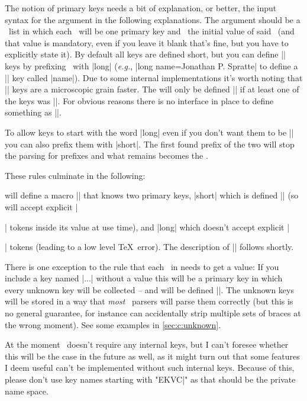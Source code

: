 The notion of primary keys needs a bit of explanation, or better, the input
syntax for the argument  in the following explanations. The
 argument should be a \kv\ list in which each \key\ will be
one primary key and \val\ the initial value of said \key\ (and that value is
mandatory, even if you leave it blank that's fine, but you have to explicitly
state it). By default all keys are defined short, but you can define |\long|
keys by prefixing \key\ with |long| (\emph{e.g.},
|long name=Jonathan P. Spratte| to define a |\long| key called |name|). Due to
some internal implementations it's worth noting that |\long| keys are a
microscopic grain faster. The  will only be defined |\long| if at least
one of the keys was |\long|. For obvious reasons there is no interface in place
to define something as |\protected|.

To allow keys to start with the word |long| even if you don't want them to be
|\long| you can also prefix them with |short|. The first found prefix of the two
will stop the parsing for prefixes and what remains becomes the \key.

These rules culminate in the following:

will define a macro |\foo| that knows two primary keys, |short| which is defined
|\long| (so will accept explicit |\par| tokens inside its value at use time),
and |long| which doesn't accept explicit |\par| tokens (leading to a low level
\TeX\ error). The description of |\ekvcSplit| follows shortly.

There is one exception to the rule that each \key\ in  needs
to get a value: If you include a key named |...| without a value this will be a
primary key in which every unknown key will be collected -- and  will
be defined |\long|. The unknown keys will be stored in a way that \emph{most}
\kv\ parsers will parse them correctly (but this is no general guarantee, for
instance  can accidentally strip multiple sets of braces at the
wrong moment). See some examples in \autoref{sec:c:unknown}.

At the moment \expkvc\ doesn't require any internal keys, but I can't foresee
whether this will be the case in the future as well, as it might turn out that
some features I deem useful can't be implemented without such internal keys.
Because of this, please don't use key names starting with "EKVC|" as that
should be the private name space.



